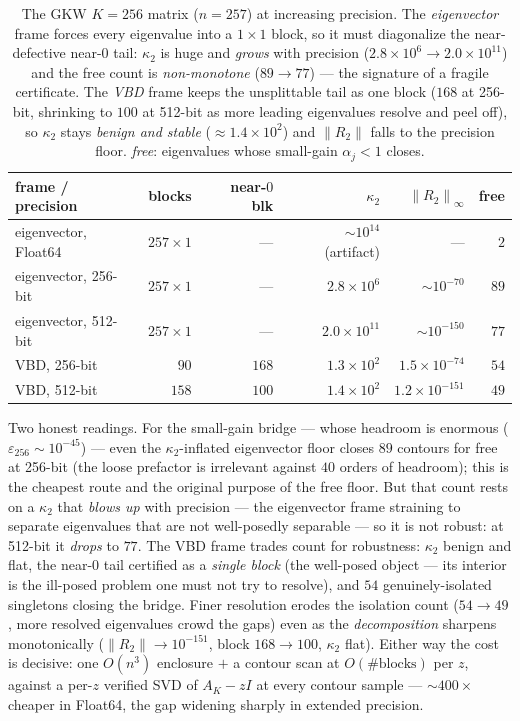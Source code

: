 \documentclass[11pt,a4paper]{article}
\newcommand{\norm}[1]{\left\|#1\right\|}
\theoremstyle{plain}
\theoremstyle{definition}
\begin{document}
\begin{table}[h]\centering
\begin{tabular}{lrrrrr}
\toprule
frame / precision & blocks & near-$0$ blk & $\kappa_2$ & $\norm{R_2}_\infty$ & free \\
\midrule
eigenvector, Float64 & $257{\times}1$ & ---   & $\sim10^{14}$ (artifact)   & ---                  & $2$  \\
eigenvector, 256-bit & $257{\times}1$ & ---   & $2.8\times10^{6}$          & $\sim10^{-70}$       & $89$ \\
eigenvector, 512-bit & $257{\times}1$ & ---   & $2.0\times10^{11}$         & $\sim10^{-150}$      & $77$ \\
VBD, 256-bit         & $90$           & $168$ & $1.3\times10^{2}$          & $1.5\times10^{-74}$  & $54$ \\
VBD, 512-bit         & $158$          & $100$ & $1.4\times10^{2}$          & $1.2\times10^{-151}$ & $49$ \\
\bottomrule
\end{tabular}
\caption{The GKW $K=256$ matrix ($n=257$) at increasing precision. The \emph{eigenvector}
frame forces every eigenvalue into a $1\times1$ block, so it must diagonalize the
near-defective near-$0$ tail: $\kappa_2$ is huge and \emph{grows} with precision
($2.8\times10^6\!\to\!2.0\times10^{11}$) and the free count is \emph{non-monotone}
($89\!\to\!77$) --- the signature of a fragile certificate. The \emph{VBD} frame keeps the
unsplittable tail as one block ($168$ at 256-bit, shrinking to $100$ at 512-bit as more
leading eigenvalues resolve and peel off), so $\kappa_2$ stays \emph{benign and stable}
($\approx1.4\times10^2$) and $\norm{R_2}$ falls to the precision floor. \emph{free}:
eigenvalues whose small-gain $\alpha_j<1$ closes.}
\label{tab:gkw}
\end{table}

Two honest readings. For the small-gain bridge --- whose headroom is enormous
($\varepsilon_{256}\sim10^{-45}$) --- even the $\kappa_2$-inflated eigenvector floor closes
$89$ contours for free at 256-bit (the loose prefactor is irrelevant against $40$ orders of
headroom); this is the cheapest route and the original purpose of the free floor. But that
count rests on a $\kappa_2$ that \emph{blows up} with precision --- the eigenvector frame
straining to separate eigenvalues that are not well-posedly separable --- so it is not
robust: at 512-bit it \emph{drops} to $77$. The VBD frame trades count for robustness:
$\kappa_2$ benign and flat, the near-$0$ tail certified as a \emph{single block} (the
well-posed object --- its interior is the ill-posed problem one must not try to resolve),
and $54$ genuinely-isolated singletons closing the bridge. Finer resolution erodes the
isolation count ($54\!\to\!49$, more resolved eigenvalues crowd the gaps) even as the
\emph{decomposition} sharpens monotonically ($\norm{R_2}\!\to\!10^{-151}$, block
$168\!\to\!100$, $\kappa_2$ flat). Either way the cost is decisive: one $O(n^3)$ enclosure
$+$ a contour scan at $O(\#\text{blocks})$ per $z$, against a per-$z$ verified SVD of
$A_K-zI$ at every contour sample --- $\sim\!400\times$ cheaper in Float64, the gap widening
sharply in extended precision.
\end{document}
